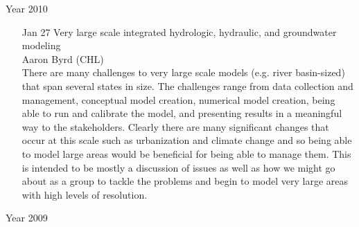 \documentclass[12]{article}
\begin{document}
\begin{center}
\Large
Year 2010
\end{center}

\begin{enumerate}

\item[Jan 27] Very large scale integrated hydrologic, hydraulic, and
groundwater modeling\\ Aaron Byrd (CHL) \\
There are many challenges to very large scale models (e.g.
river basin-sized) that span several states in size. The challenges
range from data collection and management, conceptual model creation,
numerical model creation, being able to run and calibrate the model, and
presenting results in a meaningful way to the stakeholders. Clearly
there are many significant changes that occur at this scale such as
urbanization and climate change and so being able to model large areas
would be beneficial for being able to manage them. This is intended to
be mostly a discussion of issues as well as how we might go about as a
group to tackle the problems and begin to model very large areas with
high levels of resolution. 

\end{enumerate}

\begin{center}
\Large
Year 2009
\end{center}
\end{document}
